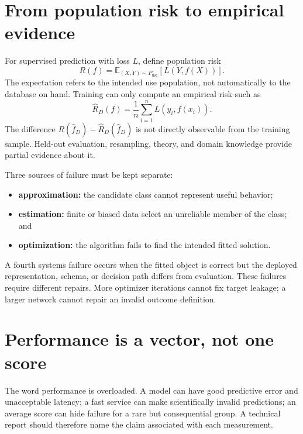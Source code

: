 \section{From population risk to empirical evidence}

For supervised prediction with loss $L$, define population risk
\[
R(f)=\mathbb{E}_{(X,Y)\sim P_{\mathrm{use}}}
      [L(Y,f(X))].
\]
The expectation refers to the intended use population, not automatically to the
database on hand. Training can only compute an empirical risk such as
\[
\widehat R_D(f)=\frac{1}{n}\sum_{i=1}^{n}L(y_i,f(x_i)).
\]
The difference $R(\widehat f_D)-\widehat R_D(\widehat f_D)$ is not directly
observable from the training sample. Held-out evaluation, resampling, theory,
and domain knowledge provide partial evidence about it.

Three sources of failure must be kept separate:

\begin{itemize}
  \item \textbf{approximation:} the candidate class cannot represent useful
  behavior;
  \item \textbf{estimation:} finite or biased data select an unreliable member
  of the class; and
  \item \textbf{optimization:} the algorithm fails to find the intended fitted
  solution.
\end{itemize}

A fourth systems failure occurs when the fitted object is correct but the
deployed representation, schema, or decision path differs from evaluation.
These failures require different repairs. More optimizer iterations cannot fix
target leakage; a larger network cannot repair an invalid outcome definition.

\section{Performance is a vector, not one score}

The word performance is overloaded. A model can have good predictive error and
unacceptable latency; a fast service can make scientifically invalid
predictions; an average score can hide failure for a rare but consequential
group. A technical report should therefore name the claim associated with each
measurement.

